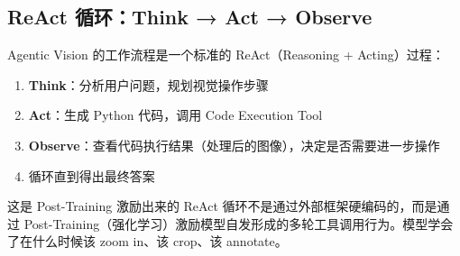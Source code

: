 \subsection{ReAct 循环：Think → Act → Observe}

Agentic Vision 的工作流程是一个标准的 ReAct（Reasoning + Acting）过程：

\begin{enumerate}
    \item \textbf{Think}：分析用户问题，规划视觉操作步骤
    \item \textbf{Act}：生成 Python 代码，调用 Code Execution Tool
    \item \textbf{Observe}：查看代码执行结果（处理后的图像），决定是否需要进一步操作
    \item 循环直到得出最终答案
\end{enumerate}

\begin{knowledgebox}{这是 Post-Training 激励出来的}
ReAct 循环不是通过外部框架硬编码的，而是通过 Post-Training（强化学习）激励模型自发形成的多轮工具调用行为。模型学会了在什么时候该 zoom in、该 crop、该 annotate。
\end{knowledgebox}


